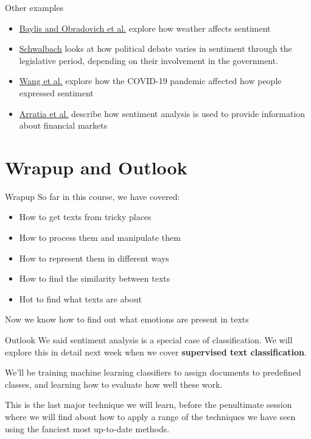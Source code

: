 \documentclass[
  10pt,
  ignorenonframetext,
  aspectratio=169]{beamer}
\newif\ifbibliography
\providecommand{\tightlist}{%
  \setlength{\itemsep}{0pt}\setlength{\parskip}{0pt}}
\begin{document}
\begin{frame}{Other examples}
\protect\hypertarget{other-examples}{}
\begin{itemize}
\tightlist
\item
  \href{https://journals.plos.org/plosone/article?id=10.1371/journal.pone.0195750}{Baylis
  and Obradovich et al.} explore how weather affects sentiment
\item
  \href{https://www.cambridge.org/core/journals/european-political-science-review/article/abs/going-in-circles-the-influence-of-the-electoral-cycle-on-the-party-behaviour-in-parliament/B4693B1A27049DB3BCE314F32D6BD1EB}{Schwalbach}
  looks at how political debate varies in sentiment through the
  legislative period, depending on their involvement in the government.
\item
  \href{https://www.nature.com/articles/s41562-022-01312-y}{Wang et al.}
  explore how the COVID-19 pandemic affected how people expressed
  sentiment
\item
  \href{https://link.springer.com/chapter/10.1007/978-3-030-66891-4_9}{Arratia
  et al.} describe how sentiment analysis is used to provide information
  about financial markets
\end{itemize}
\end{frame}

\hypertarget{wrapup-and-outlook}{%
\section{Wrapup and Outlook}\label{wrapup-and-outlook}}

\begin{frame}{Wrapup}
\protect\hypertarget{wrapup}{}
So far in this course, we have covered:

\begin{itemize}
\tightlist
\item
  How to get texts from tricky places
\item
  How to process them and manipulate them
\item
  How to represent them in different ways
\item
  How to find the similarity between texts
\item
  Hot to find what texts are about
\end{itemize}

Now we know how to find out what emotions are present in texts
\end{frame}

\begin{frame}{Outlook}
\protect\hypertarget{outlook}{}
We said sentiment analysis is a special case of classification. We will
explore this in detail next week when we cover \textbf{supervised text
classification}.

We'll be training machine learning classifiers to assign documents to
predefined classes, and learning how to evaluate how well these work.

This is the last major technique we will learn, before the penultimate
session where we will find about how to apply a range of the techniques
we have seen using the fanciest most up-to-date methods.
\end{frame}

\begin{frame}[allowframebreaks]{}
  \bibliographytrue
  
\end{frame}
\end{document}
